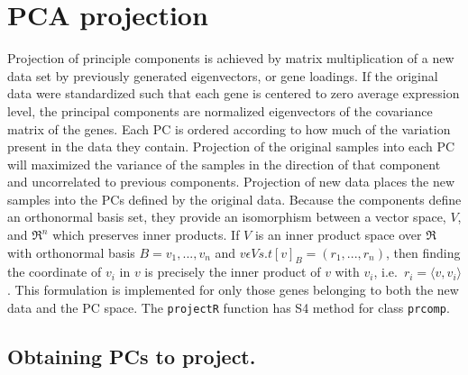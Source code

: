 \documentclass[]{article}
\begin{document}
\hypertarget{pca-projection}{%
\section{PCA projection}\label{pca-projection}}

Projection of principle components is achieved by matrix multiplication of a new data set by previously generated eigenvectors, or gene loadings. If the original data were standardized such that each gene is centered to zero average expression level, the principal components are normalized eigenvectors of the covariance matrix of the genes. Each PC is ordered according to how much of the variation present in the data they contain. Projection of the original samples into each PC will maximized the variance of the samples in the direction of that component and uncorrelated to previous components. Projection of new data places the new samples into the PCs defined by the original data. Because the components define an orthonormal basis set, they provide an isomorphism between a vector space, \(V\), and \(\Re^n\) which preserves inner products. If \(V\) is an inner product space over \(\Re\) with orthonormal basis \(B = v_1,...,v_n\) and \(v \epsilon V s.t [v]_B = (r_1,...,r_n)\), then finding the coordinate of \(v_i\) in \(v\) is precisely the inner product of \(v\) with \(v_i\), i.e.~\(r_i = \langle v,v_i \rangle\). This formulation is implemented for only those genes belonging to both the new data and the PC space. The \texttt{projectR} function has S4 method for class \texttt{prcomp}.

\hypertarget{obtaining-pcs-to-project.}{%
\subsection{Obtaining PCs to project.}\label{obtaining-pcs-to-project.}}
\end{document}
